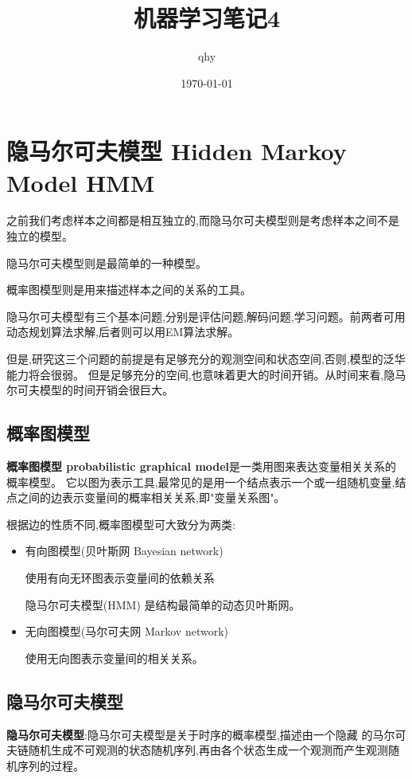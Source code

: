 \documentclass[UTF8,a4paper]{ctexart}%
\author{qhy}%
\title{机器学习笔记4}%
\date{\today}%
\begin{document}
  \maketitle
  \tableofcontents
  \newpage
    \section{隐马尔可夫模型 Hidden Markoy Model HMM}
        {\color{blue}
          之前我们考虑样本之间都是相互独立的,而隐马尔可夫模型则是考虑样本之间不是独立的模型。

          隐马尔可夫模型则是最简单的一种模型。

          概率图模型则是用来描述样本之间的关系的工具。

          隐马尔可夫模型有三个基本问题,分别是评估问题,解码问题,学习问题。前两者可用动态规划算法求解,后者则可以用EM算法求解。

          但是,研究这三个问题的前提是有足够充分的观测空间和状态空间,否则,模型的泛华能力将会很弱。
          但是足够充分的空间,也意味着更大的时间开销。从时间来看,隐马尔可夫模型的时间开销会很巨大。
        }
        \subsection{概率图模型}
            \textbf{概率图模型 probabilistic graphical model}是一类用图来表达变量相关关系的概率模型。
            它以图为表示工具,最常见的是用一个结点表示一个或一组随机变量,结点之间的边表示变量间的概率相关关系,即"变量关系图"。

            根据边的性质不同,概率图模型可大致分为两类:
            \begin{itemize}
              \item 有向图模型(贝叶斯网 Bayesian network)

                  使用有向无环图表示变量间的依赖关系

                  {\color{blue}
                      隐马尔可夫模型(HMM) 是结构最简单的动态贝叶斯网。
                  }

              \item 无向图模型(马尔可夫网 Markov network)

                  使用无向图表示变量间的相关关系。

            \end{itemize}
        \subsection{隐马尔可夫模型}
            \textbf{隐马尔可夫模型}:隐马尔可夫模型是关于时序的概率模型,描述由一个隐藏
            的马尔可夫链随机生成不可观测的状态随机序列,再由各个状态生成一个观测而产生观测随机序列的过程。
\end{document}
